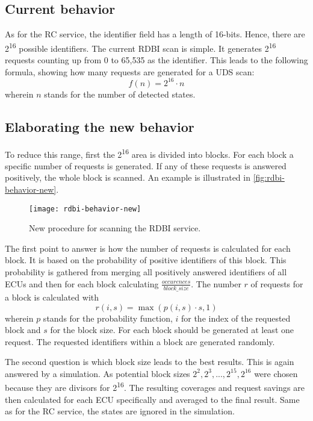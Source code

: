 \subsection{Current behavior}

As for the RC service, the identifier field has a length of 16-bits. Hence, there are 2\textsuperscript{16} possible identifiers.
The current RDBI scan is simple. It generates 2\textsuperscript{16} requests counting up from 0 to 65,535 as the identifier. This leads to the following formula, showing how many requests are generated for a UDS scan:
\[f(n)=2^{16} \cdot n\]
wherein $n$ stands for the number of detected states. 

\subsection{Elaborating the new behavior}
\label{subsubsec:rdbi-behavior}

To reduce this range, first the 2\textsuperscript{16} area is divided into blocks. For each block a specific number of requests is generated. If any of these requests is answered positively, the whole block is scanned.  An example is illustrated in \autoref{fig:rdbi-behavior-new}.

\begin{figure}[htb]
    \centering
    \texttt{[image: rdbi-behavior-new]}
    \caption{New procedure for scanning the RDBI service.}
    \label{fig:rdbi-behavior-new}
\end{figure}

The first point to answer is how the number of requests is calculated for each block. It is based on the probability of positive identifiers of this block. This probability is gathered from merging all positively answered identifiers of all ECUs and then for each block calculating $\frac{occurences}{block\_size}$. The number $r$ of requests for a block is calculated with
\[r(i, s)=\max(p(i, s) \cdot s, 1)\]
wherein $p$ stands for the probability function, $i$ for the index of the requested block and $s$ for the block size. For each block should be generated at least one request. The requested identifiers within a block are generated randomly.

The second question is which block size leads to the best results. This is again answered by a simulation. As potential block sizes $2^2, 2^3, ..., 2^{15}, 2^{16}$ were chosen because they are divisors for 2\textsuperscript{16}. The resulting coverages and request savings are then calculated for each ECU specifically and averaged to the final result. Same as for the RC service, the states are ignored in the simulation.

